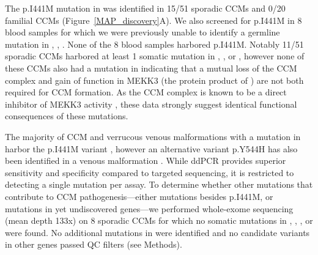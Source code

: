 The p.I441M mutation in  was identified in 15/51 sporadic CCMs and 0/20 familial CCMs (Figure~\ref{MAP_discovery}A). We also screened for  p.I441M in 8 blood samples for which we were previously unable to identify a germline mutation in , , . None of the 8 blood samples harbored  p.I441M. Notably 11/51 sporadic CCMs harbored at least 1 somatic mutation in , , or , however none of these CCMs also had a mutation in  indicating that a mutual loss of the CCM complex and gain of function in MEKK3 (the protein product of ) are not both required for CCM formation. As the CCM complex is known to be a direct inhibitor of MEKK3 activity \citep{zhou2015, zhou2016}, these data strongly suggest identical functional consequences of these mutations. 
	
The majority of CCM and verrucous venous malformations with a mutation in  harbor the p.I441M variant \citep{couto2015, hong2021, weng2021} , however an alternative variant p.Y544H has also been identified in a venous malformation \citep{alqattan2020}. While ddPCR provides superior sensitivity and specificity compared to targeted sequencing, it is restricted to detecting a single mutation per assay. To determine whether other mutations that contribute to CCM pathogenesis---either  mutations besides p.I441M, or mutations in yet undiscovered genes---we performed whole-exome sequencing (mean depth 133x) on 8 sporadic CCMs for which no somatic mutations in , , , or  were found. No additional mutations in  were identified and no candidate variants in other genes passed QC filters (see Methods). 

